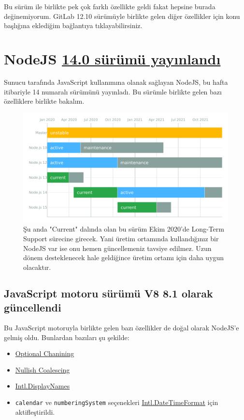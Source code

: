 \documentclass[11pt]{article}
\begin{document}
Bu sürüm ile birlikte pek çok farklı özellikte geldi fakat hepsine burada
değinemiyorum. GitLab 12.10 sürümüyle birlikte gelen diğer özellikler için
konu başlığına eklediğim bağlantıya tıklayabilirsiniz.
\section{NodeJS \href{https://medium.com/nodejs/node-js-version-14-available-now-8170d384567e}{14.0 sürümü yayınlandı}}
\label{sec:orgfd2dc34}
Sunucu tarafında JavaScript kullanımına olanak sağlayan NodeJS, bu hafta
itibariyle 14 numaralı sürümünü yayınladı. Bu sürümle birlikte gelen bazı
özelliklere birlikte bakalım.

\begin{figure}[htbp]
\centering
\includegraphics[width=.9\linewidth]{gorseller/node14-surum.png}
\caption{Şu anda "Current" dalında olan bu sürüm Ekim 2020'de Long-Term Support sürecine girecek. Yani üretim ortamında kullandığınız bir NodeJS var ise onu hemen güncellemeniz tavsiye edilmez. Uzun dönem desteklenecek hale geldiğince üretim ortamı için daha uygun olacaktır.}
\end{figure}

\subsection{JavaScript motoru sürümü V8 8.1 olarak güncellendi}
\label{sec:org7bc5b60}
Bu JavaScript motoruyla birlikte gelen bazı özellikler de doğal olarak
NodeJS'e gelmiş oldu. Bunlardan bazıları şu şekilde:

\begin{itemize}
\item \href{https://developer.mozilla.org/en-US/docs/Web/JavaScript/Reference/Operators/Optional\_chaining}{Optional Chanining}
\item \href{https://wiki.developer.mozilla.org/en-US/docs/Web/JavaScript/Reference/Operators/Nullish\_Coalescing\_Operator}{Nullish Coalescing}
\item \href{https://developer.mozilla.org/en-US/docs/Web/JavaScript/Reference/Global\_Objects/Intl/DisplayNames}{Intl.DisplayNames}
\item \texttt{calendar} ve \texttt{numberingSystem} seçenekleri \href{https://developer.mozilla.org/en-US/docs/Web/JavaScript/Reference/Global\_Objects/Intl/DateTimeFormat}{Intl.DateTimeFormat} için
aktifleştirildi.
\end{itemize}
\end{document}
